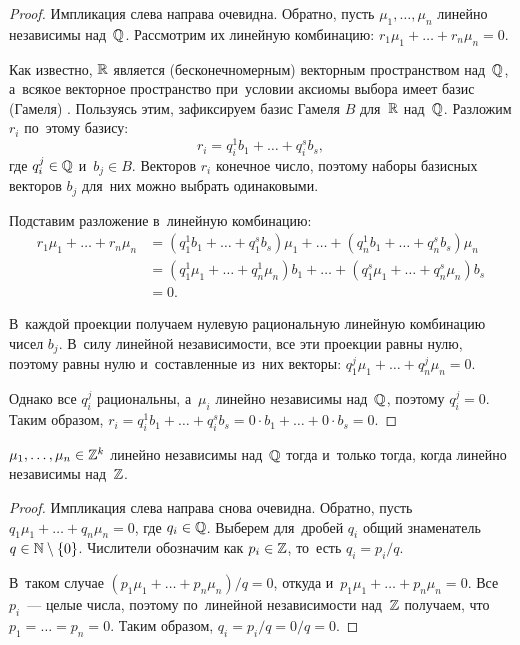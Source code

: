 \documentclass[a4paper,oneside]{article}
\begin{document}
\begin{proof}
  Импликация слева направа очевидна. Обратно, пусть $\mu_1,\allowbreak \ldots,\allowbreak \mu_n$ линейно независимы над~$\mathbb{Q}$.
  Рассмотрим их линейную комбинацию: $r_1 \mu_1 + \ldots + r_n \mu_n = 0$.

  Как известно, $\mathbb{R}$ является (бесконечномерным) векторным пространством над~$\mathbb{Q}$, а~всякое векторное пространство
  при~условии аксиомы выбора имеет базис (Гамеля) \cite{Brbk70}. Пользуясь этим, зафиксируем базис Гамеля $B$ для~$\mathbb{R}$ над~$\mathbb{Q}$.
  Разложим $r_i$ по~этому базису:
  \[
    r_i = q_i^1 b_1 + \ldots + q_i^s b_s,
  \]
  где $q_i^j \in \mathbb{Q}$ и~$b_j \in B$. Векторов $r_i$ конечное число, поэтому наборы базисных векторов $b_j$ для~них можно выбрать одинаковыми.

  Подставим разложение в~линейную комбинацию:
  \[
  \begin{aligned}
    r_1 \mu_1 + \ldots + r_n \mu_n & = (q_1^1 b_1 + \ldots + q_1^s b_s) \mu_1 + \ldots + (q_n^1 b_1 + \ldots + q_n^s b_s) \mu_n \\
                                   & = (q_1^1 \mu_1 + \ldots + q_n^1 \mu_n) b_1 + \ldots + (q_1^s \mu_1 + \ldots + q_n^s \mu_n) b_s \\
                                   & = 0.
  \end{aligned}
  \]

  В~каждой проекции получаем нулевую рациональную линейную комбинацию чисел $b_j$. В~силу линейной независимости,
  все эти проекции равны нулю, поэтому равны нулю и~составленные из~них векторы: $q_1^j \mu_1 + \ldots + q_n^j \mu_n = 0$.

  Однако все $q_i^j$ рациональны, а~$\mu_i$ линейно независимы над~$\mathbb{Q}$, поэтому $q_i^j = 0$.
  Таким образом, $r_i = q_i^1 b_1 + \ldots + q_i^s b_s = 0 \cdot b_1 + \ldots + 0 \cdot b_s = 0$.
\end{proof}

\begin{lemma*}
  $\mu_1, \ldots, \mu_n \in \mathbb{Z}^k$ линейно независимы над~$\mathbb{Q}$ тогда и~только тогда, когда линейно независимы над~$\mathbb{Z}$.
\end{lemma*}

\begin{proof}
  Импликация слева направа снова очевидна. Обратно, пусть $q_1 \mu_1 + \ldots + q_n \mu_n = 0$, где $q_i \in \mathbb{Q}$.
  Выберем для~дробей $q_i$ общий знаменатель $q \in \mathbb{N} \setminus \{ 0 \}$. Числители обозначим как $p_i \in \mathbb{Z}$, то~есть $q_i = p_i / q$.

  В~таком случае $(p_1 \mu_1 + \ldots + p_n \mu_n) / q = 0$, откуда и~$p_1 \mu_1 + \ldots + p_n \mu_n = 0$.
  Все $p_i$~— целые числа, поэтому по~линейной независимости над~$\mathbb{Z}$ получаем, что $p_1 = \ldots = p_n = 0$.
  Таким образом, $q_i = p_i / q = 0 / q = 0$.
\end{proof}
\end{document}

